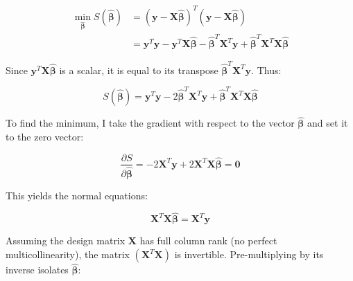 \documentclass[11pt, a4paper]{article}
\begin{document}
                                \begin{align}
                                    \min_{\hat{\boldsymbol{\beta}}} S(\hat{\boldsymbol{\beta}}) &= (\mathbf{y} - \mathbf{X}\hat{\boldsymbol{\beta}})^T (\mathbf{y} - \mathbf{X}\hat{\boldsymbol{\beta}}) \nonumber \\
                                        &= \mathbf{y}^T\mathbf{y} - \mathbf{y}^T\mathbf{X}\hat{\boldsymbol{\beta}} - \hat{\boldsymbol{\beta}}^T\mathbf{X}^T\mathbf{y} + \hat{\boldsymbol{\beta}}^T\mathbf{X}^T\mathbf{X}\hat{\boldsymbol{\beta}}
                                        \end{align}

                                        Since $\mathbf{y}^T\mathbf{X}\hat{\boldsymbol{\beta}}$ is a scalar, it is equal to its transpose $\hat{\boldsymbol{\beta}}^T\mathbf{X}^T\mathbf{y}$. Thus:

                                        \begin{equation}
                                            S(\hat{\boldsymbol{\beta}}) = \mathbf{y}^T\mathbf{y} - 2\hat{\boldsymbol{\beta}}^T\mathbf{X}^T\mathbf{y} + \hat{\boldsymbol{\beta}}^T\mathbf{X}^T\mathbf{X}\hat{\boldsymbol{\beta}}
                                            \end{equation}

                                            To find the minimum, I take the gradient with respect to the vector $\hat{\boldsymbol{\beta}}$ and set it to the zero vector:

                                            \begin{equation}
                                                \frac{\partial S}{\partial \hat{\boldsymbol{\beta}}} = -2\mathbf{X}^T\mathbf{y} + 2\mathbf{X}^T\mathbf{X}\hat{\boldsymbol{\beta}} = \mathbf{0}
                                                \end{equation}

                                                This yields the normal equations:

                                                \begin{equation}
                                                    \mathbf{X}^T\mathbf{X}\hat{\boldsymbol{\beta}} = \mathbf{X}^T\mathbf{y}
                                                    \end{equation}

                                                    Assuming the design matrix $\mathbf{X}$ has full column rank (no perfect multicollinearity), the matrix $(\mathbf{X}^T\mathbf{X})$ is invertible. Pre-multiplying by its inverse isolates $\hat{\boldsymbol{\beta}}$:
\end{document}
